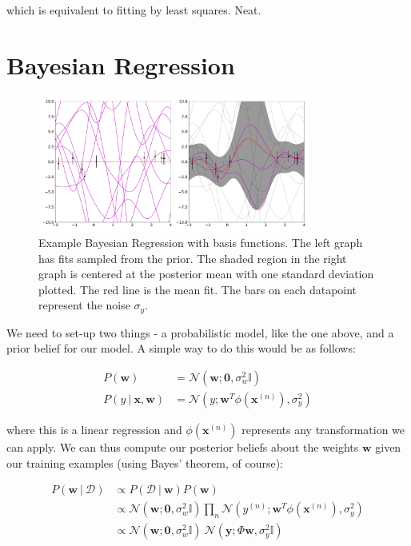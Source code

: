 \documentclass{article}
\newcommand{\vf}[1]{\mathbf{#1}}
\newcommand{\bx}{\vf{x}}
\newcommand{\by}{\vf{y}}
\newcommand{\bw}{\vf{w}}
\newcommand{\giv}{\ |\ }
\begin{document}
which is equivalent to fitting by least squares. Neat.

\section{Bayesian Regression}
\begin{figure}
    \centering
    \includegraphics[width=0.8\textwidth]{figures/bayes_regression}
    \caption{Example Bayesian Regression with basis functions. The left graph has fits sampled from the prior. The shaded region in the right graph is centered at the posterior mean with one standard deviation plotted. The red line is the mean fit. The bars on each datapoint represent the noise $\sigma_y$.}
    \label{fig:bayes_regression}
\end{figure}

We need to set-up two things - a probabilistic model, like the one above, and a prior belief for our model. A simple way to do this would be as follows:

\begin{align*}
    P(\bw) &= \mathcal{N}(\bw; \vf{0}, \sigma_w^2 \mathbb{I}) \\
    P(y\ |\ \bx, \bw) &= \mathcal{N}(y; \bw^T \phi(\bx^{(n)}), \sigma_y^2)
\end{align*}

where this is a linear regression and $\phi(\bx^{(n)})$ represents any transformation we can apply. We can thus compute our posterior beliefs about the weights $\bw$ given our training examples (using Bayes' theorem, of course):

\begin{align*}
    P(\bw \giv \mathcal{D}) &\propto P(\mathcal{D} \giv \bw) P(\bw) \\
        &\propto \mathcal{N}(\bw; \vf{0}, \sigma_w^2 \mathbb{I})
            \prod_n \mathcal{N}(y^{(n)}; \bw^T \phi(\bx^{(n)}), \sigma_y^2) \\
        &\propto \mathcal{N}(\bw; \vf{0}, \sigma_w^2 \mathbb{I})\ 
            \mathcal{N}(\by; \Phi \bw, \sigma_y^2 \mathbb{I})
\end{align*}
\end{document}
